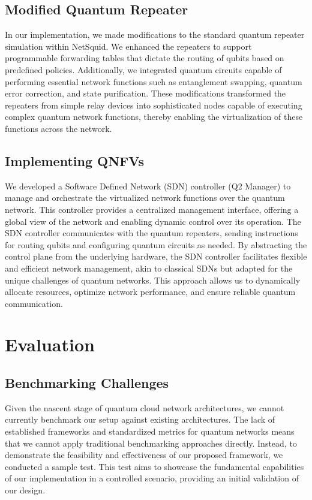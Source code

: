 \documentclass[sigplan,screen]{acmart}
\begin{document}
\subsection{Modified Quantum Repeater}
In our implementation, we made modifications to the standard quantum repeater simulation within NetSquid. We enhanced the repeaters to support programmable forwarding tables that dictate the routing of qubits based on predefined policies. Additionally, we integrated quantum circuits capable of performing essential network functions such as entanglement swapping, quantum error correction, and state purification. These modifications transformed the repeaters from simple relay devices into sophisticated nodes capable of executing complex quantum network functions, thereby enabling the virtualization of these functions across the network.

\subsection{Implementing QNFVs}
We developed a Software Defined Network (SDN) controller (Q2 Manager) to manage and orchestrate the virtualized network functions over the quantum network. This controller provides a centralized management interface, offering a global view of the network and enabling dynamic control over its operation. The SDN controller communicates with the quantum repeaters, sending instructions for routing qubits and configuring quantum circuits as needed. By abstracting the control plane from the underlying hardware, the SDN controller facilitates flexible and efficient network management, akin to classical SDNs but adapted for the unique challenges of quantum networks. This approach allows us to dynamically allocate resources, optimize network performance, and ensure reliable quantum communication.

\section{Evaluation}

\subsection{Benchmarking Challenges}
Given the nascent stage of quantum cloud network architectures, we cannot currently benchmark our setup against existing architectures. The lack of established frameworks and standardized metrics for quantum networks means that we cannot apply traditional benchmarking approaches directly. Instead, to demonstrate the feasibility and effectiveness of our proposed framework, we conducted a sample test. This test aims to showcase the fundamental capabilities of our implementation in a controlled scenario, providing an initial validation of our design.
\end{document}
